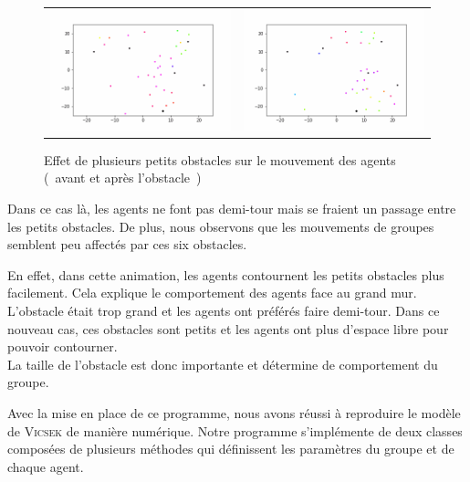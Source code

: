 \documentclass[french, a4paper, 12pt, openany]{report}
\begin{document}
		\begin{figure}[!h]
		\centering
		\begin{tabular}{cc}
			\includegraphics[width=8cm]{images/image_20.png} & \includegraphics[width=8cm]{images/image_21.png} \\
		\end{tabular}
		\caption{Effet de plusieurs petits obstacles sur le mouvement des agents (~avant et après l'obstacle~)}
		\label{obstacles2}
	\end{figure}
	
	Dans ce cas là, les agents ne font pas demi-tour mais se fraient un passage entre les petits obstacles. De plus, nous observons que les mouvements de groupes semblent peu affectés par ces six obstacles.
	
	 En effet, dans cette animation, les agents contournent les petits obstacles plus facilement. Cela explique le comportement des agents face au grand mur. L'obstacle était trop grand et les agents ont préférés faire demi-tour. Dans ce nouveau cas, ces obstacles sont petits et les agents ont plus d'espace libre pour pouvoir contourner. \\
	 
	 La taille de l'obstacle est donc importante et détermine de comportement du groupe.  
	


   Avec la mise en place de ce programme, nous avons réussi à reproduire le modèle de \textsc{Vicsek} de manière numérique. Notre programme s'implémente de deux classes composées de plusieurs méthodes qui définissent les paramètres du groupe et de chaque agent.\\
   
\end{document}
